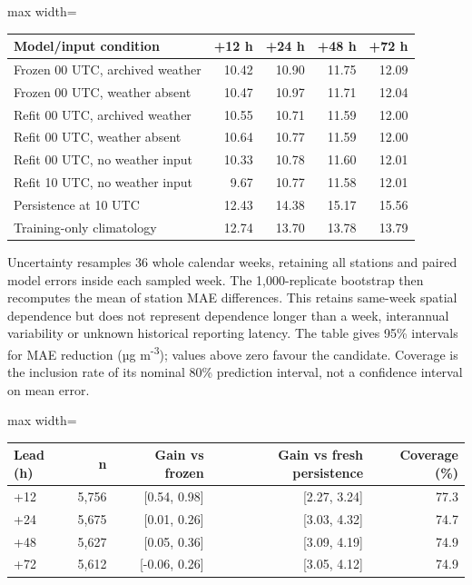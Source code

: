 \documentclass[11pt,a4paper]{article}
\begin{document}
\begin{table}[H]
\centering
\small
\begin{adjustbox}{max width=\linewidth}
\begin{tabular}{lrrrr}
\toprule
Model/input condition & +12 h & +24 h & +48 h & +72 h \\
\midrule
Frozen 00 UTC, archived weather & 10.42 & 10.90 & 11.75 & 12.09 \\
Frozen 00 UTC, weather absent & 10.47 & 10.97 & 11.71 & 12.04 \\
Refit 00 UTC, archived weather & 10.55 & 10.71 & 11.59 & 12.00 \\
Refit 00 UTC, weather absent & 10.64 & 10.77 & 11.59 & 12.00 \\
Refit 00 UTC, no weather input & 10.33 & 10.78 & 11.60 & 12.01 \\
Refit 10 UTC, no weather input & 9.67 & 10.77 & 11.58 & 12.01 \\
Persistence at 10 UTC & 12.43 & 14.38 & 15.17 & 15.56 \\
Training-only climatology & 12.74 & 13.70 & 13.78 & 13.79 \\
\bottomrule
\end{tabular}
\end{adjustbox}
\end{table}

Uncertainty resamples 36 whole calendar weeks, retaining all stations and paired model errors inside each sampled week. The 1,000-replicate bootstrap then recomputes the mean of station MAE differences. This retains same-week spatial dependence but does not represent dependence longer than a week, interannual variability or unknown historical reporting latency. The table gives 95\% intervals for MAE reduction (µg m\textsuperscript{-3}); values above zero favour the candidate. Coverage is the inclusion rate of its nominal 80\% prediction interval, not a confidence interval on mean error.

\begin{table}[H]
\centering
\small
\begin{adjustbox}{max width=\linewidth}
\begin{tabular}{lrrrr}
\toprule
Lead (h) & n & Gain vs frozen & Gain vs fresh persistence & Coverage (\%) \\
\midrule
+12 & 5,756 & [0.54, 0.98] & [2.27, 3.24] & 77.3 \\
+24 & 5,675 & [0.01, 0.26] & [3.03, 4.32] & 74.7 \\
+48 & 5,627 & [0.05, 0.36] & [3.09, 4.19] & 74.9 \\
+72 & 5,612 & [-0.06, 0.26] & [3.05, 4.12] & 74.9 \\
\bottomrule
\end{tabular}
\end{adjustbox}
\end{table}
\end{document}

